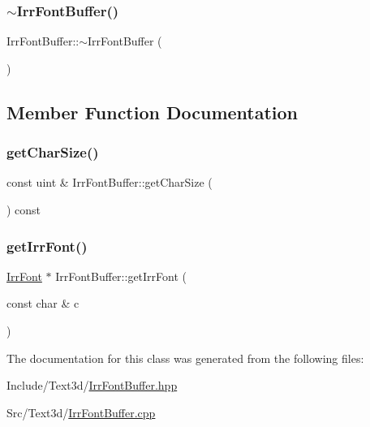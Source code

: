 \mbox{\label{class_irr_font_buffer_a72c1f4bfdd9845cd40759a38804985e6}} 
\subsubsection{\texorpdfstring{$\sim$IrrFontBuffer()}{~IrrFontBuffer()}}
{\footnotesize\ttfamily Irr\+Font\+Buffer\+::$\sim$\+Irr\+Font\+Buffer (\begin{DoxyParamCaption}{ }\end{DoxyParamCaption})}



\subsection{Member Function Documentation}
\mbox{\label{class_irr_font_buffer_aac3084fd3f7ff2ecdcb8017718e735ef}} 
\subsubsection{\texorpdfstring{getCharSize()}{getCharSize()}}
{\footnotesize\ttfamily const uint \& Irr\+Font\+Buffer\+::get\+Char\+Size (\begin{DoxyParamCaption}{ }\end{DoxyParamCaption}) const}

\mbox{\label{class_irr_font_buffer_a4a740aaaee5853aee7af7d49ddca3f00}} 
\subsubsection{\texorpdfstring{getIrrFont()}{getIrrFont()}}
{\footnotesize\ttfamily \mbox{\hyperlink{class_irr_font}{Irr\+Font}} $\ast$ Irr\+Font\+Buffer\+::get\+Irr\+Font (\begin{DoxyParamCaption}\item[{const char \&}]{c }\end{DoxyParamCaption})}



The documentation for this class was generated from the following files\+:\begin{DoxyCompactItemize}
\item 
Include/\+Text3d/\mbox{\hyperlink{_irr_font_buffer_8hpp}{Irr\+Font\+Buffer.\+hpp}}\item 
Src/\+Text3d/\mbox{\hyperlink{_irr_font_buffer_8cpp}{Irr\+Font\+Buffer.\+cpp}}\end{DoxyCompactItemize}
